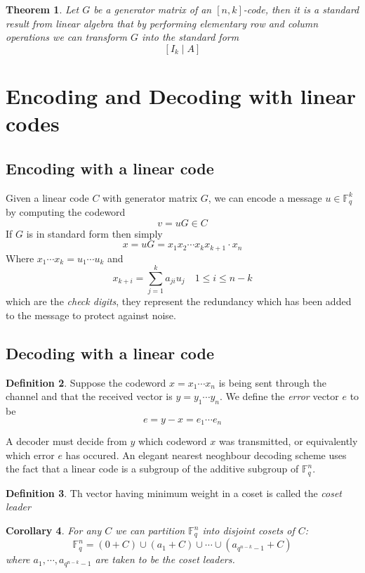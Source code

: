 \documentclass[11pt,a4paper]{article}
\theoremstyle{definition}
\newtheorem{definition}{Definition}[section]
\theoremstyle{plain}
\newtheorem{theorem}[definition]{Theorem}
\newtheorem{corollary}[definition]{Corollary}
\theoremstyle{remark}
\begin{document}
\begin{theorem}
    Let $G$ be a generator matrix of an $[n,k]$-code, then it is a standard result from linear algebra that by performing elementary row and column operations we can 
    transform $G$ into the \emph{standard form} 
    $$ [I_k \mid A]$$
\end{theorem}

\section{Encoding and Decoding with linear codes} 

\subsection{Encoding with a linear code}

Given a linear code $C$ with generator matrix $G$, we can encode a message $u \in \mathbb{F}_q^k$ by computing the codeword
$$v = uG \in C$$
If $G$ is in standard form then simply 
$$x = uG = x_1 x_2 \cdots x_k x_{k+1} \cdot x_n$$
Where $x_1 \cdots x_k = u_1 \cdots u_k$ and 
$$x_{k+i} = \sum_{j=1}^{k} a_{ji}u_j \quad 1 \leq i \leq n - k$$
which are the \emph{check digits}, they represent the redundancy which has been added to the message to protect against noise. 

\subsection{Decoding with a linear code}

\begin{definition}
    Suppose the codeword $x = x_1 \cdots x_n$ is being sent through the channel and that the received 
    vector is $y = y_1 \cdots y_n$. We define the \emph{error} vector $e$ to be 
    $$e = y - x = e_1 \cdots e_n$$
\end{definition}

A decoder must decide from $y$ which codeword $x$ was transmitted, or equivalently which error $e$ has occured. 
An elegant nearest neoghbour decoding scheme uses the fact that a linear code is a subgroup of the additive subgroup of $\mathbb{F}_q^n$. 

\begin{definition}
    Th vector having minimum weight in a coset is called the \emph{coset leader}
\end{definition}

\begin{corollary}
    For any $C$ we can partition $\mathbb{F}_q^n$ into disjoint cosets of $C$: 
    $$\mathbb{F}_q^n = (0 + C) \cup (a_1 + C) \cup \cdots \cup (a_{q^{n-k} - 1} + C)$$
    where $a_1, \cdots, a_{q^{n-k} - 1}$ are taken to be the coset leaders.
\end{corollary}
\end{document}
